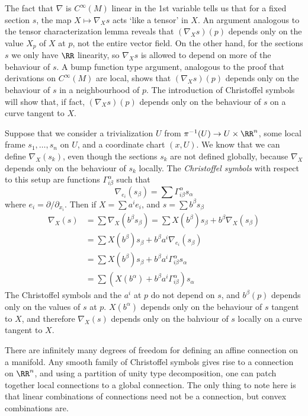 The fact that $\nabla$ is $C^\infty(M)$ linear in the 1st variable tells us that for a fixed section $s$, the map $X \mapsto \nabla_X s$ acts `like a tensor' in $X$. An argument analogous to the tensor characterization lemma reveals that $(\nabla_X s)(p)$ depends only on the value $X_p$ of $X$ at $p$, not the entire vector field. On the other hand, for the sections $s$ we only have $\RR$ linearity, so $\nabla_X s$ is allowed to depend on more of the behaviour of $s$. A bump function type argument, analogous to the proof that derivations on $C^\infty(M)$ are local, shows that $(\nabla_X s)(p)$ depends only on the behaviour of $s$ in a neighbourhood of $p$. The introduction of Christoffel symbols will show that, if fact, $(\nabla_X s)(p)$ depends only on the behaviour of $s$ on a curve tangent to $X$.

Suppose that we consider a trivialization $U$ from $\pi^{-1}(U) \to U \times \RR^n$, some local frame $s_1, \dots, s_n$ on $U$, and a coordinate chart $(x,U)$. We know that we can define $\nabla_X(s_k)$, even though the sections $s_k$ are not defined globally, because $\nabla_X$ depends only on the behaviour of $s_k$ locally.  The \emph{Christoffel symbols} with respect to this setup are functions $\Gamma_{i \beta}^\alpha$ such that
%
\[ \nabla_{e_i}(s_\beta) = \sum \Gamma_{i \beta}^\alpha s_\alpha \]
%
where $e_i = \partial/\partial_{x_i}$. Then if $X = \sum a^i e_i$, and $s = \sum b^\beta s_\beta$
%
\begin{align*}
    \nabla_X(s) &= \sum \nabla_X(b^\beta s_\beta) = \sum X(b^\beta) s_\beta + b^\beta \nabla_X(s_\beta)\\
    &= \sum X(b^\beta) s_\beta + b^\beta a^i \nabla_{e_i}(s_\beta)\\
    &= \sum X(b^\beta) s_\beta + b^\beta a^i \Gamma_{i \beta}^\alpha s_\alpha\\
    &= \sum \left( X(b^\alpha) + b^\beta a^i \Gamma_{i \beta}^\alpha \right) s_\alpha
\end{align*}
%
The Christoffel symbols and the $a^i$ at $p$ do not depend on $s$, and $b^\beta(p)$ depends only on the values of $s$ at $p$. $X(b^\alpha)$ depends only on the behaviour of $s$ tangent to $X$, and therefore $\nabla_X(s)$ depends only on the bahviour of $s$ locally on a curve tangent to $X$.

There are infinitely many degrees of freedom for defining an affine connection on a manifold. Any smooth family of Christoffel symbols gives rise to a connection on $\RR^n$, and using a partition of unity type decomposition, one can patch together local connections to a global connection. The only thing to note here is that linear combinations of connections need not be a connection, but convex combinations are.

